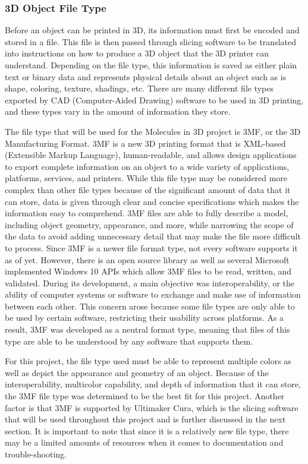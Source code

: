 \documentclass[letterpaper, onecolumn, draftclsnofoot, 10pt, compsoc]{IEEEtran}
\begin{document}
\begin{singlespace}
        \subsubsection{3D Object File Type}
	Before an object can be printed in 3D, its information must first be encoded and stored in a file. 
    This file is then passed through slicing software to be translated into instructions on how to produce a 3D object that the 3D printer can understand. 
	Depending on the file type, this information is saved as either plain text or binary data and represents physical details about an object such as is shape, coloring, texture, shadings, etc. \cite{all3dpweb}
	There are many different file types exported by CAD (Computer-Aided Drawing) software to be used in 3D printing, and these types vary in the amount of information they store. \par
	The file type that will be used for the Molecules in 3D project is 3MF, or the 3D Manufacturing Format.
	3MF is a new 3D printing format that is XML-based (Extensible Markup Language), human-readable, and allows design applications to export complete information on an object to a wide variety of applications, platforms, services, and printers. \cite{3mfweb}
	While this file type may be considered more complex than other file types because of the significant amount of data that it can store, data is given through clear and concise specifications which makes the information easy to comprehend.
	3MF files are able to fully describe a model, including object geometry, appearance, and more, while narrowing the scope of the data to avoid adding unnecessary detail that may make the file more difficult to process. 
	Since 3MF is a newer file format type, not every software supports it as of yet.
	However, there is an open source library as well as several Microsoft implemented Windows 10 APIs which allow 3MF files to be read, written, and validated. 
	During its development, a main objective was interoperability, or the ability of computer systems or software to exchange and make use of information between each other. 
    This concern arose because some file types are only able to be used by certain software, restricting their usability across platforms.  
	As a result, 3MF was developed as a neutral format type, meaning that files of this type are able to be understood by any software that supports them. \cite{3mfweb} \par
    For this project, the file type used must be able to represent multiple colors as well as depict the appearance and geometry of an object.
    Because of the interoperability, multicolor capability, and depth of information that it can store, the 3MF file type was determined to be the best fit for this project. 
    Another factor is that 3MF is supported by Ultimaker Cura, which is the slicing software that will be used throughout this project and is further discussed in the next section.
    It is important to note that since it is a relatively new file type, there may be a limited amounts of resources when it comes to documentation and trouble-shooting. 

\end{singlespace}
\end{document}
